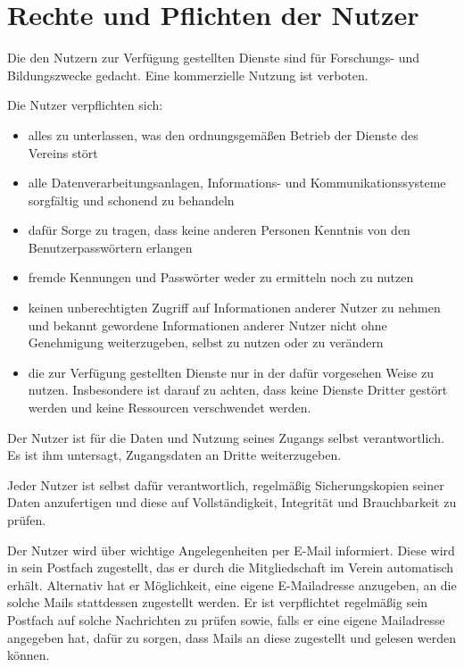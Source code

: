 \documentclass[a4paper,10pt]{scrartcl}
\begin{document}
\section{Rechte und Pflichten der Nutzer}
Die den Nutzern zur Verfügung gestellten Dienste sind für Forschungs- und Bildungszwecke gedacht. Eine kommerzielle Nutzung ist verboten.

Die Nutzer verpflichten sich:

\begin{itemize}
        \item alles zu unterlassen, was den ordnungsgemäßen Betrieb der Dienste des Vereins stört
        \item alle Datenverarbeitungsanlagen, Informations- und Kommunikationssysteme sorgfältig und schonend zu behandeln
        \item dafür Sorge zu tragen, dass keine anderen Personen Kenntnis von den Benutzerpasswörtern erlangen
        \item fremde Kennungen und Passwörter weder zu ermitteln noch zu nutzen
        \item keinen unberechtigten Zugriff auf Informationen anderer Nutzer zu nehmen und bekannt gewordene Informationen anderer Nutzer nicht ohne Genehmigung weiterzugeben, selbst zu nutzen oder zu verändern
        \item die zur Verfügung gestellten Dienste nur in der dafür vorgesehen Weise zu nutzen. Insbesondere ist darauf zu achten, dass keine Dienste Dritter gestört werden und keine Ressourcen verschwendet werden. 
\end{itemize}

Der Nutzer ist für die Daten und Nutzung seines Zugangs selbst verantwortlich. Es ist ihm untersagt, Zugangsdaten an Dritte weiterzugeben.

Jeder Nutzer ist selbst dafür verantwortlich, regelmäßig Sicherungskopien seiner Daten anzufertigen und diese auf Vollständigkeit, Integrität und Brauchbarkeit zu prüfen.

Der Nutzer wird über wichtige Angelegenheiten per E-Mail informiert. Diese wird in sein Postfach zugestellt, das er durch die Mitgliedschaft im Verein automatisch erhält. Alternativ hat er Möglichkeit, eine eigene E-Mailadresse anzugeben, an die solche Mails stattdessen zugestellt werden. Er ist verpflichtet regelmäßig sein Postfach auf solche Nachrichten zu prüfen sowie, falls er eine eigene Mailadresse angegeben hat, dafür zu sorgen, dass Mails an diese zugestellt und gelesen werden können. 
\end{document}
